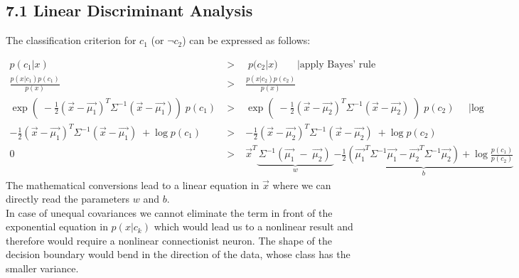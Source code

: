 \documentclass[10pt,a4paper]{article}
\begin{document}
\pagestyle{fancy}

\subsection*{7.1 Linear Discriminant Analysis}

The classification criterion for $c_1$ (or $\lnot c_2$) can be expressed as follows:

\begin{eqnarray}
p(c_1|x)\; &\;>\;&\; p(c_2|x)\;\;\;\;\;\;\;| \mbox{apply Bayes' rule}\\
\frac{p(x|c_1) p(c_1)}{p(x)} &\;>\;& \frac{p(x|c_2) p(c_2)}{p(x)}\\
\exp(\; -\frac{1}{2}(\vec{x}-\vec{\mu_1})^T \Sigma^{-1} (\vec{x}-\vec{\mu_1}))\;p(c_1) &\;>\;& \exp(\; -\frac{1}{2}(\vec{x}-\vec{\mu_2})^T \Sigma^{-1} (\vec{x}-\vec{\mu_2}) \;)\;p(c_2)\;\;\;\;\;| \mbox{log} \\
 -\frac{1}{2}(\vec{x}-\vec{\mu_1})^T \Sigma^{-1} (\vec{x}-\vec{\mu_1})\; + \log{p(c_1)} &\; > \;& -\frac{1}{2}(\vec{x}-\vec{\mu_2})^T \Sigma^{-1} (\vec{x}-\vec{\mu_2}) \; + \log{p(c_2)} \\
0 &\; > \;& \vec{x}^T \underbrace{\,\Sigma^{-1}(\vec{\mu_1}\;-\;\vec{\mu_2})\;}_{w} \underbrace{- \frac{1}{2}( \vec{\mu_1}^T \Sigma^{-1} \vec{\mu_1} - \vec{\mu_2}^T \Sigma^{-1} \vec{\mu_2}) + \log{\frac{p(c_1)}{p(c_2)}} }_{b}
\end{eqnarray}
\noindent
The mathematical conversions lead to a linear equation in $\vec{x}$ where we can directly read the parameters $w$ and $b$.\\
In case of unequal covariances we cannot eliminate the term in front of the exponential equation in $p(x|c_k)$ which would lead us to a nonlinear result and therefore would require a nonlinear connectionist neuron.
The shape of the decision boundary would bend in the direction of the data, whose class has the smaller variance.
\end{document}
